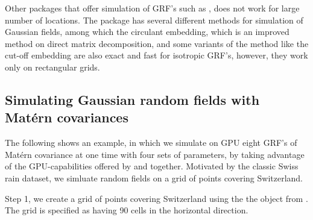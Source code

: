 \documentclass[article,nojss]{jss}\usepackage[]{graphicx}\usepackage[]{color}
\begin{document}
Other  packages that offer simulation of GRF's such as  \citep{geoR2001}, does not work for large number of locations. The  \citep{RandomFields2015} package has several different methods for simulation of Gaussian fields, among which the circulant embedding, which is an improved method on direct matrix decomposition, and some variants of the method like the cut-off embedding \citep{gneiting2006fast} are also exact and fast for isotropic GRF's, however, they work only on rectangular grids. 




\subsection{Simulating Gaussian random fields with Mat\'ern covariances}

The following shows an example, in which we simulate on GPU eight GRF's of Mat\'ern covariance at one time with four sets of parameters, by taking advantage of the GPU-capabilities offered by  and  together.  Motivated by the classic Swiss rain dataset, we simluate random fields on a grid of points covering Switzerland.  



Step 1, we create a grid of points covering Switzerland using the the  object from .  The grid is specified as having 90 cells in the horizontal direction.
\end{document}
